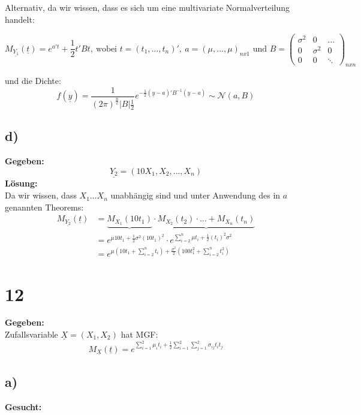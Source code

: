 \documentclass{article}
\begin{document}
Alternativ, da wir wissen, dass es sich um eine multivariate Normalverteilung handelt:

\[M_{\underline{Y_1}}(\underline{t}) = e^{a't} + \frac{1}{2}t'Bt, ~ \text{wobei }  t = (t_1,\ldots, t_n)',~  a = (\mu, \ldots, \mu)_{n x 1} \text{ und } B = \begin{pmatrix}
    \sigma^2& 0 & \ldots \\
    0 &\sigma^2 & 0 \\
    0 & 0 &\ddots 
\end{pmatrix}_{nxn}\] 

und die Dichte:
\[f(\underline{y}) = \frac{1}{(2\pi)^{\frac{n}{2}}|B|\frac{1}{2}} e^{-\frac{1}{2}(\underline{y} - a)'B^{-1}(\underline{y}-a)} \sim \mathcal{N}(a, B)\]
\subsection*{d)}
\textbf{Gegeben:}\\

\[\underline{Y_{2}} = (10 X_1, X_2, \ldots, X_n)\] 
\textbf{Lösung:} \\

Da wir wissen, dass $X_1 \ldots X_n$ unabhängig sind und unter Anwendung des in $a$ genannten Theorems:
\begin{align*}
    M_{\underline{Y_2}}(\underline{t})&= \underbrace{M_{X_1}(10t_1)} \cdot \underbrace{M_{X_2}(t_2) \cdot \ldots + M_{X_n}(t_n)} \\
    &= e^{\mu 10 t_1 + \frac{1}{2}\sigma^2 (10t_1)^2} \cdot e^{\sum_{i = 2}^{n}\mu t_i + \frac{1}{2}(t_i)^2\sigma^2} \\
    &= e^{\mu(10t_1 + \sum_{i=2}^{n}t_i) + \frac{\sigma^2}{2}(100t_1^2 + \sum_{i=2}^{n}t_i^2)}
\end{align*}

\section*{12}
\textbf{Gegeben:}\\

Zufallsvariable $\underline{X} = (X_1, X_2)$ hat MGF:
\[M_{\underline{X}}(\underline{t}) = e^{\sum_{i = 1}^{2}\mu_i t_i + \frac{1}{2}\sum_{i = 1}^{2}\sum_{j = 1}^{2}\sigma_{ij}t_it_j}\]
\subsection*{a)}
\textbf{Gesucht:} \\
\end{document}
